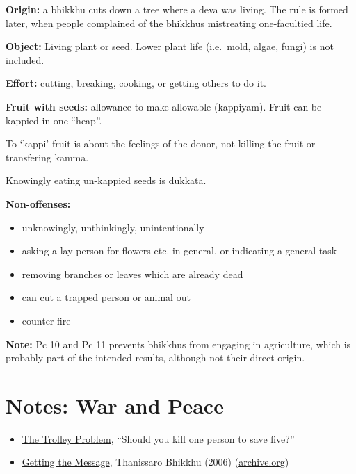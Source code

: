 \begin{multicols}{2}

\textbf{Origin:} a bhikkhu cuts down a tree where a deva was living. The
rule is formed later, when people complained of the bhikkhus mistreating
one-facultied life.

\textbf{Object:} Living plant or seed. Lower plant life (i.e.~mold,
algae, fungi) is not included.

\textbf{Effort:} cutting, breaking, cooking, or getting others to do it.

\textbf{Fruit with seeds:} allowance to make allowable (kappiyam). Fruit
can be kappied in one ``heap''.

\columnbreak

To `kappi' fruit is about the feelings of the donor, not killing the
fruit or transfering kamma.

Knowingly eating un-kappied seeds is dukkata.

\textbf{Non-offenses:}

\begin{itemize}
\tightlist
\item
  unknowingly, unthinkingly, unintentionally
\item
  asking a lay person for flowers etc. in general, or indicating a
  general task
\item
  removing branches or leaves which are already dead
\item
  can cut a trapped person or animal out
\item
  counter-fire
\end{itemize}

\end{multicols}
\par
\enlargethispage{2\baselineskip}

\textbf{Note:} Pc 10 and Pc 11 prevents bhikkhus from engaging in
agriculture, which is probably part of the intended results, although
not their direct origin.

\section{Notes: War and Peace}

\begin{itemize}
\item
  \href{https://en.wikipedia.org/wiki/Trolley_problem}{The Trolley
  Problem}, ``Should you kill one person to save five?''
\item
  \href{https://www.buddhistinquiry.org/article/getting-the-message/}{Getting
  the Message}, Thanissaro Bhikkhu (2006)
  (\href{https://web.archive.org/web/20201113023105/https://www.buddhistinquiry.org/article/getting-the-message/}{archive.org})
\end{itemize}

